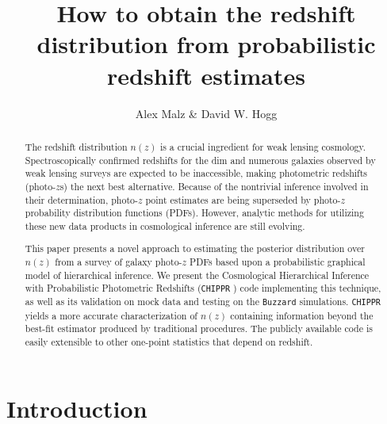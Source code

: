 \documentclass[preprint]{aastex}
\newcommand{\chippr}{\texttt{CHIPPR} }
\begin{document}
\title{How to obtain the redshift distribution from probabilistic redshift 
estimates}

\author{Alex Malz \& David W. Hogg}


\begin{abstract}
The redshift distribution $n(z)$ is a crucial ingredient for weak lensing 
cosmology.  Spectroscopically confirmed redshifts for the dim and numerous 
galaxies observed by weak lensing surveys are expected to be inaccessible, 
making photometric redshifts (photo-$z$s) the next best alternative.  Because 
of the nontrivial inference involved in their determination, photo-$z$ point 
estimates are being superseded by photo-$z$ probability distribution functions 
(PDFs).  However, analytic methods for utilizing these new data products in 
cosmological inference are still evolving.

This paper presents a novel approach to estimating the posterior distribution 
over $n(z)$ from a survey of galaxy photo-$z$ PDFs based upon a probabilistic 
graphical model of hierarchical inference.  We present the Cosmological 
Hierarchical Inference with Probabilistic Photometric Redshifts (\chippr) code 
implementing this technique, as well as its validation on mock data and testing 
on the \texttt{Buzzard} simulations.  \chippr yields a more accurate 
characterization of $n(z)$ containing information beyond the best-fit estimator 
produced by traditional procedures.  The publicly available code is easily 
extensible to other one-point statistics that depend on redshift.

\end{abstract}


\section{Introduction}
\label{sec:introduction}
\end{document}
